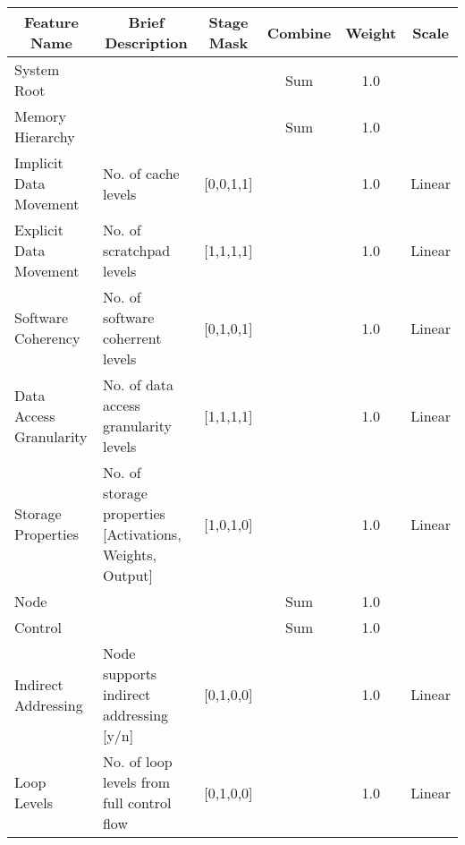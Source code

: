 
\centering
\begin{tabularx}{\textwidth}{@{}lXcccc@{}}
\toprule
\multicolumn{1}{c}{Feature Name} & 
\multicolumn{1}{c}{Brief Description} & 
\multicolumn{1}{c}{Stage Mask} & 
\multicolumn{1}{c}{Combine} & 
\multicolumn{1}{c}{Weight} & 
\multicolumn{1}{c}{Scale} \\ \midrule
\hspace{0mm} System Root &  &  & Sum & 1.0 &  \\ 

\hspace{3mm} Memory Hierarchy &  &  & Sum & 1.0 &  \\ 

\hspace{6mm} Implicit Data Movement & No. of cache levels & [0,0,1,1] &  & 1.0 & Linear \\ 

\hspace{6mm} Explicit Data Movement & No. of scratchpad levels & [1,1,1,1] &  & 1.0 & Linear \\ 

\hspace{6mm} Software Coherency & No. of software coherrent levels & [0,1,0,1] &  & 1.0 & Linear \\ 

\hspace{6mm} Data Access Granularity & No. of data access granularity levels & [1,1,1,1] &  & 1.0 & Linear \\ 

\hspace{6mm} Storage Properties & No. of storage properties [Activations, Weights, Output] & [1,0,1,0] &  & 1.0 & Linear \\ 

\hspace{3mm} Node &  &  & Sum & 1.0 &  \\ 

\hspace{6mm} Control &  &  & Sum & 1.0 &  \\ 

\hspace{9mm} Indirect Addressing & Node supports indirect addressing [y/n] & [0,1,0,0] &  & 1.0 & Linear \\ 

\hspace{9mm} Loop Levels & No. of loop levels from full control flow & [0,1,0,0] &  & 1.0 & Linear \\ 


\end{tabularx}
